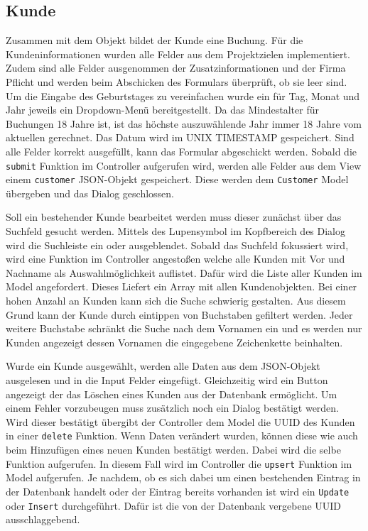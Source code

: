 \subsection{Kunde}
Zusammen mit dem Objekt bildet der Kunde eine Buchung. Für die Kundeninformationen wurden alle Felder aus dem Projektzielen implementiert. Zudem sind alle Felder ausgenommen der Zusatzinformationen und der Firma Pflicht und werden beim Abschicken des Formulars überprüft, ob sie leer sind. Um die Eingabe des Geburtstages zu vereinfachen wurde ein für Tag, Monat und Jahr jeweils ein Dropdown-Menü bereitgestellt. Da das Mindestalter für Buchungen 18 Jahre ist, ist das höchste auszuwählende Jahr immer 18 Jahre vom aktuellen gerechnet. Das Datum wird im UNIX TIMESTAMP gespeichert. Sind alle Felder korrekt ausgefüllt, kann das Formular abgeschickt werden. Sobald die \texttt{submit} Funktion im Controller aufgerufen wird, werden alle Felder aus dem View einem \texttt{customer} JSON-Objekt gespeichert. Diese werden dem \texttt{Customer} Model übergeben und das Dialog geschlossen. 

Soll ein bestehender Kunde bearbeitet werden muss dieser zunächst über das Suchfeld gesucht werden. Mittels des Lupensymbol im Kopfbereich des Dialog wird die Suchleiste ein oder ausgeblendet. Sobald das Suchfeld fokussiert wird, wird eine Funktion im Controller angestoßen welche alle Kunden mit Vor und Nachname als Auswahlmöglichkeit auflistet. Dafür wird die Liste aller Kunden im Model angefordert. Dieses Liefert ein Array mit allen Kundenobjekten. Bei einer hohen Anzahl an Kunden kann sich die Suche schwierig gestalten. Aus diesem Grund kann der Kunde durch eintippen von Buchstaben gefiltert werden. Jeder weitere Buchstabe schränkt die Suche nach dem Vornamen ein und es werden nur Kunden angezeigt dessen Vornamen die eingegebene Zeichenkette beinhalten. 

Wurde ein Kunde ausgewählt, werden alle Daten aus dem JSON-Objekt ausgelesen und in die Input Felder eingefügt. Gleichzeitig wird ein Button angezeigt der das Löschen eines Kunden aus der Datenbank ermöglicht. Um einem Fehler vorzubeugen muss zusätzlich noch ein Dialog bestätigt werden. Wird dieser bestätigt übergibt der Controller dem Model die UUID des Kunden in einer \texttt{delete} Funktion. 
Wenn Daten verändert wurden, können diese wie auch beim Hinzufügen eines neuen Kunden bestätigt werden. Dabei wird die selbe Funktion aufgerufen. In diesem Fall wird im Controller die \texttt{upsert} Funktion im Model aufgerufen. Je nachdem, ob es sich dabei um einen bestehenden Eintrag in der Datenbank handelt oder der Eintrag bereits vorhanden ist wird ein \texttt{Update} oder \texttt{Insert} durchgeführt. Dafür ist die von der Datenbank vergebene UUID ausschlaggebend.

